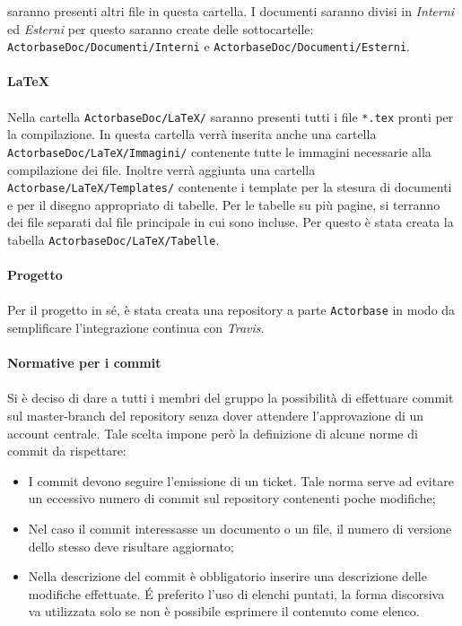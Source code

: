 \documentclass[a4paper]{article}
\begin{document}
	saranno presenti altri file in questa cartella. I documenti saranno divisi in \emph{Interni} ed \emph{Esterni} per questo saranno create 
    delle sottocartelle: \verb|ActorbaseDoc/Documenti/Interni| e \verb|ActorbaseDoc/Documenti/Esterni|.
	\\ \\
    \textbf{LaTeX} \\ \\
	Nella cartella \verb|ActorbaseDoc/LaTeX/| saranno presenti tutti i file \verb|*.tex| pronti per la compilazione. In questa cartella verrà inserita
	anche una cartella\\ \verb|ActorbaseDoc/LaTeX/Immagini/| contenente tutte le immagini necessarie alla compilazione dei file.
	Inoltre verrà aggiunta una cartella \verb|Actorbase/LaTeX/Templates/| contenente i template per la stesura di documenti e per il
	disegno appropriato di tabelle. 
    Per le tabelle su più pagine, si terranno dei file separati dal file principale in cui sono incluse. Per questo è stata creata la tabella 
    \verb|ActorbaseDoc/LaTeX/Tabelle|.
    \\ \\
	\textbf{Progetto} \\ \\
    Per il progetto in sé, è stata creata una repository a parte \verb|Actorbase| in modo da semplificare l'integrazione continua con \emph{Travis}.
	\\ \\
    \textbf{Normative per i commit} \\ \\
		Si è deciso di dare a tutti i membri del gruppo la possibilità di effettuare commit sul master-branch del repository
		senza dover attendere l'approvazione di un account centrale. Tale scelta impone però la definizione di alcune norme
		di commit da rispettare:
		\begin{itemize}
			\item I commit devono seguire l'emissione di un ticket. Tale norma serve ad evitare un eccessivo numero di
			 commit sul repository contenenti poche modifiche;
			\item Nel caso il commit interessasse un documento o un file, il numero di versione dello stesso deve risultare
			 aggiornato;
			\item Nella descrizione del commit è obbligatorio inserire una descrizione delle modifiche effettuate. \'E preferito
			l'uso di elenchi puntati, la forma discorsiva va utilizzata solo se non è possibile esprimere il contenuto come
			elenco.
		\end{itemize}
\end{document}
